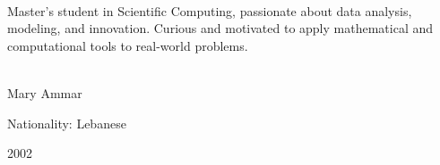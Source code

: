 \documentclass[lighthipster]{simplehipstercv}
\begin{document}
\setlength{\columnsep}{1.5cm}
\begin{paracol}{2}




\paracolbackgroundoptions



\footnotesize
{\setasidefontcolour
\flushright

\begin{center}
\end{center}

\\[0.5em]

{{\footnotesize
Master's student in Scientific Computing, passionate about data analysis, modeling, and innovation.  
Curious and motivated to apply mathematical and computational tools to real-world problems.
}
}
\bigskip

 \\[0.5em]
Mary Ammar

Nationality: Lebanese 

2002

\bigskip


}
\end{paracol}
\end{document}
